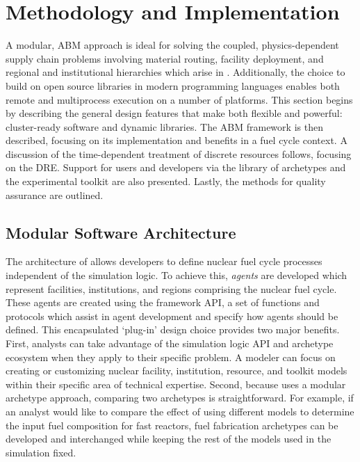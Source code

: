 \section{Methodology and Implementation}

A modular, \acrfull{ABM} approach is ideal for solving the coupled,
physics-dependent supply chain problems involving material routing, facility
deployment, and regional and institutional hierarchies which arise in \Cyclus. Additionally, the choice
to build \Cyclus on open source libraries in modern programming languages
enables both remote and multiprocess execution on a number of platforms. This
section begins by describing the general design features that make \Cyclus both
flexible and powerful: cluster-ready software and dynamic libraries.  The
\gls{ABM} framework is then described, focusing on its implementation and benefits
in a fuel cycle context. A discussion of the
time-dependent treatment of discrete resources follows, focusing on the
\gls{DRE}. Support for users and developers via the \Cycamore library of
archetypes and the experimental toolkit are also presented.  Lastly, the methods
for quality assurance are outlined.

\subsection{Modular Software Architecture}

The architecture of \Cyclus allows developers to define nuclear fuel cycle
processes independent of the simulation logic. To achieve this, \emph{agents} are
developed which represent facilities, institutions, and regions comprising the
nuclear fuel cycle. These agents are created using the \Cyclus framework
\gls{API}, a set of functions and protocols which assist in agent development
and specify how agents should be defined.  This encapsulated `plug-in' design
choice provides two major benefits. First, analysts can take advantage of the
simulation logic \gls{API} and archetype ecosystem when they apply \Cyclus to
their specific problem.  A modeler can focus on creating or customizing
nuclear facility, institution, resource, and toolkit models within their
specific area of technical expertise. Second, because \Cyclus uses a modular
archetype approach, comparing two archetypes is straightforward. For example, if
an analyst would like to compare the effect of using different models to
determine the input fuel composition for fast reactors, fuel
fabrication archetypes can be developed and interchanged while keeping the rest
of the models used in the simulation fixed.


